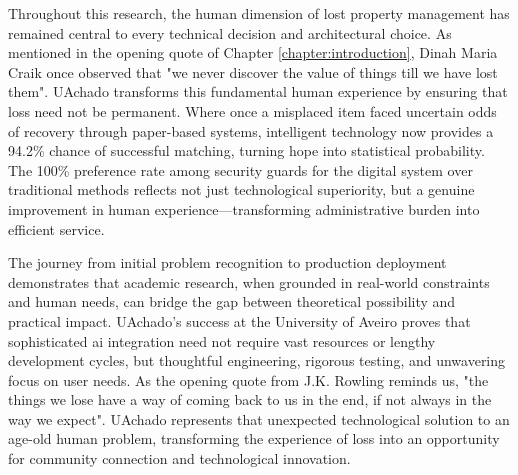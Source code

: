 Throughout this research, the human dimension of lost property management has remained central to every technical decision and architectural choice. As mentioned in the opening quote of Chapter \ref{chapter:introduction}, Dinah Maria Craik once observed that "we never discover the value of things till we have lost them". UAchado transforms this fundamental human experience by ensuring that loss need not be permanent. Where once a misplaced item faced uncertain odds of recovery through paper-based systems, intelligent technology now provides a 94.2\% chance of successful matching, turning hope into statistical probability. The 100\% preference rate among security guards for the digital system over traditional methods reflects not just technological superiority, but a genuine improvement in human experience—transforming administrative burden into efficient service.

The journey from initial problem recognition to production deployment demonstrates that academic research, when grounded in real-world constraints and human needs, can bridge the gap between theoretical possibility and practical impact. UAchado's success at the University of Aveiro proves that sophisticated \ac{ai} integration need not require vast resources or lengthy development cycles, but thoughtful engineering, rigorous testing, and unwavering focus on user needs. As the opening quote from J.K. Rowling reminds us, "the things we lose have a way of coming back to us in the end, if not always in the way we expect". UAchado represents that unexpected technological solution to an age-old human problem, transforming the experience of loss into an opportunity for community connection and technological innovation.

